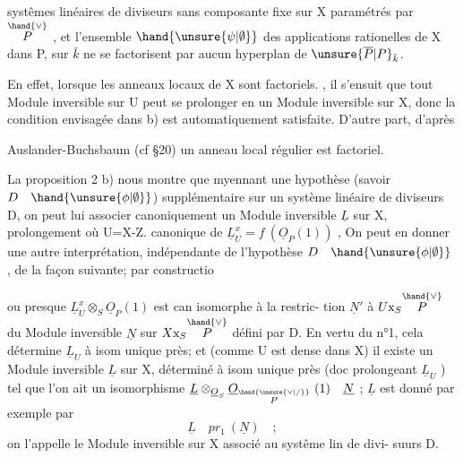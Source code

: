 
systêmes linéaires de diviseurs sans composante fixe  sur X paramétrés
par $\overset{\hand{\vee}}{P}$ , et l'ensemble $\hand{\unsure{\psi|\emptyset}}$  des applications rationelles de X dans P, 
sur $\bar{k}$ ne se factorisent par aucun hyperplan de $\unsure{\overline{P}|P}_{\bar{k}}$.


En effet, lorsque les anneaux locaux de X sont factoriels.  , il s'ensuit que tout Module inversible sur
U peut se prolonger en un Module inversible sur X, donc la condition
envisagée dans b) est automatiquement satisfaite. D'autre part, d'après

Auslander-Buchsbaum (cf §20) un annea\hand{/}u local
régulier est factoriel.

\placedmargin{\unsure{$\times\quad\times\quad\nearrow$}}La proposition 2  b)  nous montre que myennant une hypothèse
(savoir $D\quad\hand{\unsure{\phi|\emptyset}}$)
supplémentaire sur un système linéaire de diviseurs D, on peut
lui associer canoniquement un Module inversible $\underline{L}$ sur X, prolongement
où U=X-Z.
canonique de $\underline{L}^{x}_{U} = f\ (\underline{O}_P(1))$ ,  On peut en donner une autre interprétation,
indépendante de l'hypothèse  $D\quad\hand{\unsure{\phi|\emptyset}}$ , de la façon suivante; par constructio

 ou presque $\underline{L}^{x}_{U}\otimes_S\underline{O}_P(1)$ est  can isomorphe à la restric-%
tion $\underline{N}'$ à $U\mathrm{x}_S\overset{\hand{\vee}}{P}$  du  Module inversible $\underline{N}$  sur $X\mathrm{x}_S\overset{\hand{\vee}}{P}$  défini par D. En vertu
du  n°1, cela détermine  $\underline{L}_U$  à isom unique près;
et  (comme U est dense dans X)  il existe  un Module inversible $\underline{L}$ sur X,
déterminé à isom unique près (doc prolongeant $\underline{L}_U$ ) tel que  l'on ait
un isomorphisme  $\underline{L}\otimes_{\underline{O}_S}\underline{O}_{\overset{\hand{\unsure{\vee|/}}}{P}}\ (1) \quad \underline{N}$ ;  $\underline{L}$  est donné par exemple par
\[ \underline{L} \quad pr_1\ (\underline{N}) \quad ; \]
on l'appelle  le Module inversible sur X associé au systême lin de divi-%
suurs D.

